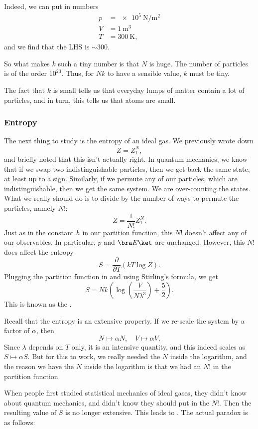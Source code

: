 \documentclass[a4paper]{article}
\begin{document}
Indeed, we can put in numbers
\begin{align*}
  p &= \SI{e5}{\newton\per\meter\squared}\\
  V &= \SI{1}{\meter\cubed}\\
  T &= \SI{300}{\kelvin},
\end{align*}
and we find that the LHS is $\sim 300$.

So what makes $k$ such a tiny number is that $N$ is huge. The number of particles is of the order $10^{23}$. Thus, for $Nk$ to have a sensible value, $k$ must be tiny.

The fact that $k$ is small tells us that everyday lumps of matter contain a lot of particles, and in turn, this tells us that atoms are small.

\subsubsection*{Entropy}
The next thing to study is the entropy of an ideal gas. We previously wrote down
\[
  Z = Z_1^N,
\]
and briefly noted that this isn't actually right. In quantum mechanics, we know that if we swap two indistinguishable particles, then we get back the same state, at least up to a sign. Similarly, if we permute any of our particles, which are indistinguishable, then we get the same system. We are over-counting the states. What we really should do is to divide by the number of ways to permute the particles, namely $N!$:
\[
  Z = \frac{1}{N!} Z_1^N.
\]
Just as in the constant $h$ in our partition function, this $N!$ doesn't affect any of our observables. In particular, $p$ and $\bra E\ket$ are unchanged. However, this $N!$ does affect the entropy
\[
  S = \frac{\partial}{\partial T} (kT \log Z).
\]
Plugging the partition function in and using Stirling's formula, we get
\[
  S = Nk \left(\log \left(\frac{V}{N\lambda^3}\right) + \frac{5}{2}\right).
\]
This is known as the .

Recall that the entropy is an extensive property. If we re-scale the system by a factor of $\alpha$, then
\[
  N \mapsto \alpha N,\quad V \mapsto \alpha V.
\]
Since $\lambda$ depends on $T$ only, it is an intensive quantity, and this indeed scales as $S \mapsto \alpha S$. But for this to work, we really needed the $N$ inside the logarithm, and the reason we have the $N$ inside the logarithm is that we had an $N!$ in the partition function.

When people first studied statistical mechanics of ideal gases, they didn't know about quantum mechanics, and didn't know they should put in the $N!$. Then the resulting value of $S$ is no longer extensive. This leads to . The actual paradox is as follows:
\end{document}
